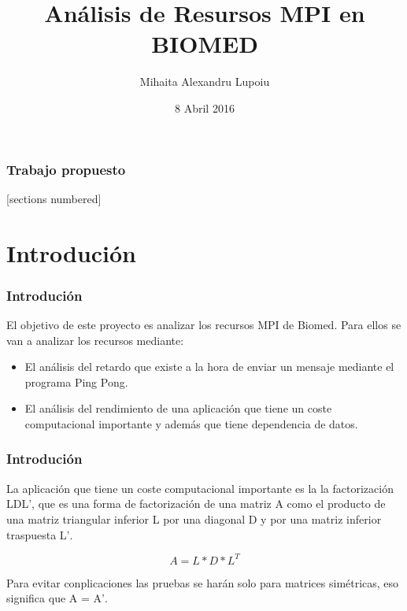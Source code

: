 \documentclass[10pt]{beamer}
\title{Análisis de Resursos MPI en BIOMED}
\date{8 Abril 2016}
\author{Mihaita Alexandru Lupoiu}
\institute{Modelos de Programación en Grid (Mpg)}
\begin{document}
\maketitle
\begin{frame}
  \frametitle{Trabajo propuesto}
  [sections numbered]
  \tableofcontents[hideallsubsections]
\end{frame}
\section{Introdución}
\begin{frame}[fragile]
  \frametitle{Introdución}
  
  El objetivo de este proyecto es analizar los recursos MPI de Biomed. Para ellos se van a analizar los recursos mediante:
  
\begin{itemize}
\item El análisis del retardo que existe a la hora de enviar un mensaje mediante el programa Ping Pong.
\item El análisis del rendimiento de una aplicación que tiene un coste computacional importante y además que tiene dependencia de datos.
\end{itemize}
  
\end{frame}
\begin{frame}[fragile]
\frametitle{Introdución}

La aplicación que tiene un coste computacional importante es la la factorización \textsc{LDL'}, que es una forma de factorización de una matriz \textsc{A} como el producto de una matriz triangular inferior \textsc{L} por una diagonal \textsc{D} y por una matriz inferior traspuesta \textsc{L'}.

  \begin{equation*}
    A = L*D*L^T
  \end{equation*}

  Para evitar conplicaciones las pruebas se harán solo para matrices simétricas, eso significa que \textsc{A = A'}.
\end{frame}
\end{document}
